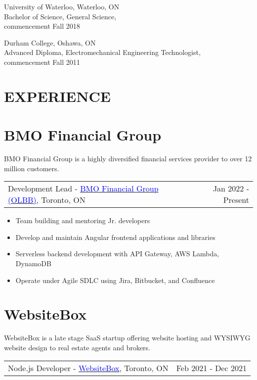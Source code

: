 \documentclass[margin]{res}
\begin{document}
\begin{resume}
	University of Waterloo, Waterloo, ON \\
	Bachelor of Science, General Science, \\
	commencement Fall 2018

	Durham College, Oshawa, ON \\
	Advanced Diploma, Electromechanical Engineering Technologist, \\
	commencement Fall 2011


	\section{\textcolor{NavyBlue}{EXPERIENCE}}

	\normalsize{\section{BMO Financial Group}}

	BMO Financial Group is a highly diversified financial services provider to over 12 million customers.

	\begin{tabular}{p{3in} r} %
		Development Lead - \href{https://bmo.com}{\textcolor{blue}{BMO Financial Group (OLBB)}}, Toronto, ON & Jan 2022 - Present
	\end{tabular}

	\begin{itemize} %
		\item Team building and mentoring Jr. developers
		\item Develop and maintain Angular frontend applications and libraries
		\item Serverless backend development with API Gateway, AWS Lambda, DynamoDB
		\item Operate under Agile SDLC using Jira, Bitbucket, and Confluence
	\end{itemize}

	\normalsize{\section{WebsiteBox}}

	WebsiteBox is a late stage SaaS startup offering website hosting and WYSIWYG
	website design to real estate agents and brokers.

	\begin{tabular}{p{3in} r} %
		Node.js Developer - \href{https://websitebox.com}{\textcolor{blue}{WebsiteBox}}, Toronto, ON & Feb 2021 - Dec 2021
	\end{tabular}


\end{resume}
\end{document}
